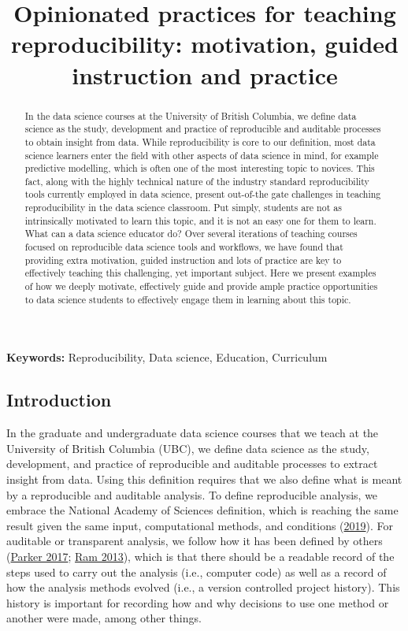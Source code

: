 \documentclass{article}
\title{Opinionated practices for teaching reproducibility: motivation,
guided instruction and practice}
\author{
  }
\begin{document}
\maketitle

\def\tightlist{}


\begin{abstract}
In the data science courses at the University of British Columbia, we
define data science as the study, development and practice of
reproducible and auditable processes to obtain insight from data. While
reproducibility is core to our definition, most data science learners
enter the field with other aspects of data science in mind, for example
predictive modelling, which is often one of the most interesting topic
to novices. This fact, along with the highly technical nature of the
industry standard reproducibility tools currently employed in data
science, present out-of-the gate challenges in teaching reproducibility
in the data science classroom. Put simply, students are not as
intrinsically motivated to learn this topic, and it is not an easy one
for them to learn. What can a data science educator do? Over several
iterations of teaching courses focused on reproducible data science
tools and workflows, we have found that providing extra motivation,
guided instruction and lots of practice are key to effectively teaching
this challenging, yet important subject. Here we present examples of how
we deeply motivate, effectively guide and provide ample practice
opportunities to data science students to effectively engage them in
learning about this topic.
\end{abstract}


\textbf{Keywords:} Reproducibility, Data science, Education, Curriculum

\newpage
\doublespacing

\hypertarget{introduction}{%
\subsection{Introduction}\label{introduction}}

In the graduate and undergraduate data science courses that we teach at
the University of British Columbia (UBC), we define data science as the
study, development, and practice of reproducible and auditable processes
to extract insight from data. Using this definition requires that we
also define what is meant by a reproducible and auditable analysis. To
define reproducible analysis, we embrace the National Academy of
Sciences definition, which is reaching the same result given the same
input, computational methods, and conditions
(\protect\hyperlink{ref-national2019reproducibility}{2019}). For
auditable or transparent analysis, we follow how it has been defined by
others (\protect\hyperlink{ref-parker2017opinionated}{Parker 2017};
\protect\hyperlink{ref-ram2013git}{Ram 2013}), which is that there
should be a readable record of the steps used to carry out the analysis
(i.e., computer code) as well as a record of how the analysis methods
evolved (i.e., a version controlled project history). This history is
important for recording how and why decisions to use one method or
another were made, among other things.
\end{document}
